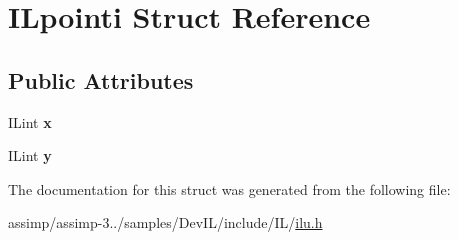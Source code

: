 \hypertarget{struct_i_lpointi}{\section{I\+Lpointi Struct Reference}
\label{struct_i_lpointi}
}
\subsection*{Public Attributes}
\begin{DoxyCompactItemize}
\item 
\hypertarget{struct_i_lpointi_a12cb4b980c0b1b6e5dfcaf04cae1d504}{I\+Lint {\bfseries x}}\label{struct_i_lpointi_a12cb4b980c0b1b6e5dfcaf04cae1d504}

\item 
\hypertarget{struct_i_lpointi_a403879303445d06970e87be9d38ecce5}{I\+Lint {\bfseries y}}\label{struct_i_lpointi_a403879303445d06970e87be9d38ecce5}

\end{DoxyCompactItemize}


The documentation for this struct was generated from the following file\+:\begin{DoxyCompactItemize}
\item 
assimp/assimp-\/3../samples/\+Dev\+I\+L/include/\+I\+L/\hyperlink{ilu_8h}{ilu.\+h}\end{DoxyCompactItemize}
